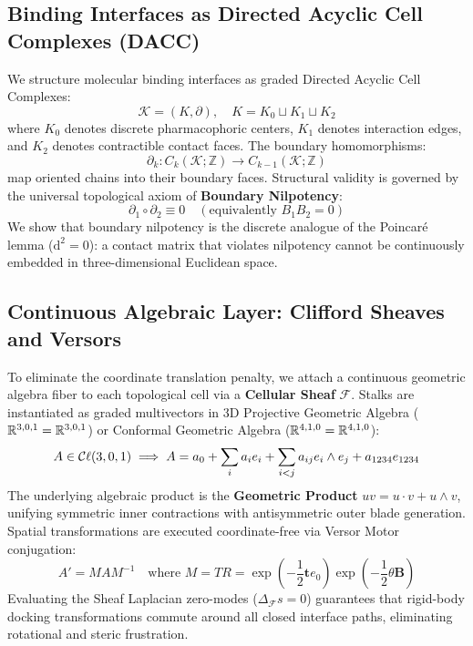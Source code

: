 \subsection{Binding Interfaces as Directed Acyclic Cell Complexes (DACC)}
We structure molecular binding interfaces as graded Directed Acyclic Cell Complexes:
\begin{equation}
    \mathcal{K} = (K, \partial), \quad K = K_0 \sqcup K_1 \sqcup K_2
\end{equation}
where $K_0$ denotes discrete pharmacophoric centers, $K_1$ denotes interaction edges, and $K_2$ denotes contractible contact faces. The boundary homomorphisms:
\begin{equation}
    \partial_k : C_k(\mathcal{K}; \mathbb{Z}) \longrightarrow C_{k-1}(\mathcal{K}; \mathbb{Z})
\end{equation}
map oriented chains into their boundary faces. Structural validity is governed by the universal topological axiom of \textbf{Boundary Nilpotency}:
\begin{equation}
    \partial_1 \circ \partial_2 \equiv 0 \quad (\text{equivalently } B_1 B_2 = 0)
\end{equation}
We show that boundary nilpotency is the discrete analogue of the Poincaré lemma ($\mathrm{d}^2 = 0$): a contact matrix that violates nilpotency cannot be continuously embedded in three-dimensional Euclidean space.

\subsection{Continuous Algebraic Layer: Clifford Sheaves and Versors}
To eliminate the coordinate translation penalty, we attach a continuous geometric algebra fiber to each topological cell via a \textbf{Cellular Sheaf} $\mathcal{F}$. Stalks are instantiated as graded multivectors in 3D Projective Geometric Algebra ($\mathbb{R}^{3,0,1} = \mathbb{R}^{3,0,1}$) or Conformal Geometric Algebra ($\mathbb{R}^{4,1,0} = \mathbb{R}^{4,1,0}$):
\begin{equation}
    A \in \mathcal{C}\ell(3,0,1) \implies A = a_0 + \sum_i a_i e_i + \sum_{i<j} a_{ij} e_i \wedge e_j + a_{1234} e_{1234}
\end{equation}
The underlying algebraic product is the \textbf{Geometric Product} $uv = u \cdot v + u \wedge v$, unifying symmetric inner contractions with antisymmetric outer blade generation. Spatial transformations are executed coordinate-free via Versor Motor conjugation:
\begin{equation}
    A' = M A M^{-1} \quad \text{where } M = T R = \exp\left(-\frac{1}{2} \mathbf{t} e_0\right) \exp\left(-\frac{1}{2} \theta \mathbf{B}\right)
\end{equation}
Evaluating the Sheaf Laplacian zero-modes ($\Delta_{\mathcal{F}} s = 0$) guarantees that rigid-body docking transformations commute around all closed interface paths, eliminating rotational and steric frustration.

